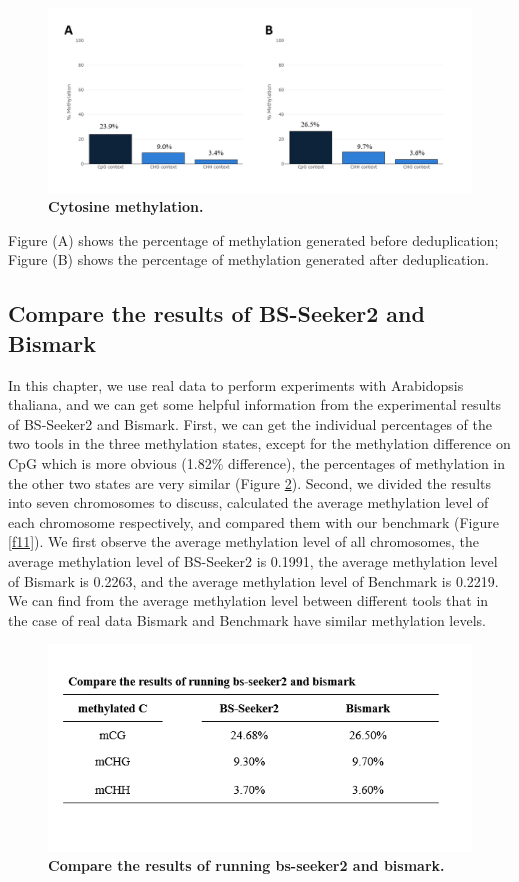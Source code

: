 \documentclass{PHlab-thesis}
\begin{document}
\begin{figure}[h]
  \centering
  \includegraphics[scale=0.8]{figures/cytosine_methylation.png}
  \caption{\textbf{Cytosine methylation.}
  }
  \label{f9}
\end{figure}

Figure (A) shows the percentage of methylation generated before deduplication; Figure (B) shows the percentage of methylation generated after deduplication.

\subsection{Compare the results of BS-Seeker2 and Bismark}
In this chapter, we use real data to perform experiments with Arabidopsis thaliana, and we can get some helpful information from the experimental results of BS-Seeker2 and Bismark. First, we can get the individual percentages of the two tools in the three methylation states, except for the methylation difference on CpG which is more obvious (1.82\% difference), the percentages of methylation in the other two states are very similar (Figure \ref{f10}). Second, we divided the results into seven chromosomes to discuss, calculated the average methylation level of each chromosome respectively, and compared them with our benchmark (Figure \ref{f11}). We first observe the average methylation level of all chromosomes, the average methylation level of BS-Seeker2 is 0.1991, the average methylation level of Bismark is 0.2263, and the average methylation level of Benchmark is 0.2219. We can find from the average methylation level between different tools that in the case of real data Bismark and Benchmark have similar methylation levels.

\begin{figure}[h]
  \centering
  \includegraphics[scale=1.0]{table/table3.png}
  \caption{\textbf{Compare the results of running bs-seeker2 and bismark.}
  }
  \label{f10}
\end{figure}
\end{document}
